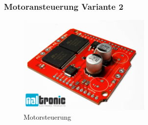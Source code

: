 \subsubsection{Motoransteuerung Variante 2}
\begin{figure}[H] 
\begin{center}

\includegraphics[width=6.5cm]{Bilder/Bauteile/Motorsteuerung}
\caption{Motorsteuerung}
\label{Motoransteuerung}

\end{center}
\end{figure}
